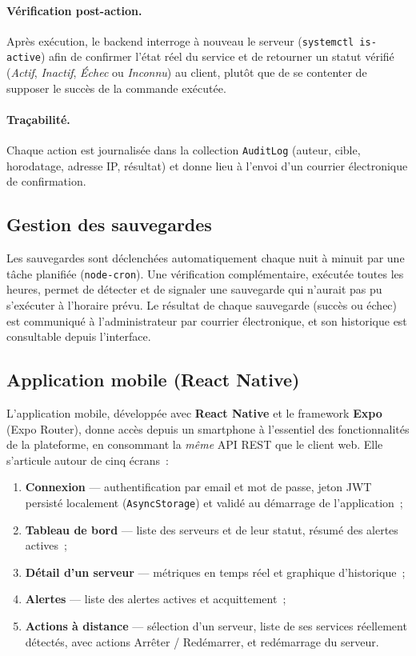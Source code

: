 \paragraph{Vérification post-action.} Après exécution, le backend interroge à nouveau le serveur (\texttt{systemctl is-active}) afin de confirmer l'état réel du service et de retourner un statut vérifié (\emph{Actif}, \emph{Inactif}, \emph{Échec} ou \emph{Inconnu}) au client, plutôt que de se contenter de supposer le succès de la commande exécutée.

\paragraph{Traçabilité.} Chaque action est journalisée dans la collection \texttt{AuditLog} (auteur, cible, horodatage, adresse IP, résultat) et donne lieu à l'envoi d'un courrier électronique de confirmation.

\subsection{Gestion des sauvegardes}

Les sauvegardes sont déclenchées automatiquement chaque nuit à minuit par une tâche planifiée (\texttt{node-cron}). Une vérification complémentaire, exécutée toutes les heures, permet de détecter et de signaler une sauvegarde qui n'aurait pas pu s'exécuter à l'horaire prévu. Le résultat de chaque sauvegarde (succès ou échec) est communiqué à l'administrateur par courrier électronique, et son historique est consultable depuis l'interface.

\subsection{Application mobile (React Native)}

L'application mobile, développée avec \textbf{React Native} et le framework \textbf{Expo} (Expo Router), donne accès depuis un smartphone à l'essentiel des fonctionnalités de la plateforme, en consommant la \emph{même} API REST que le client web. Elle s'articule autour de cinq écrans~:

\begin{enumerate}
  \item \textbf{Connexion} — authentification par email et mot de passe, jeton JWT persisté localement (\texttt{AsyncStorage}) et validé au démarrage de l'application~;
  \item \textbf{Tableau de bord} — liste des serveurs et de leur statut, résumé des alertes actives~;
  \item \textbf{Détail d'un serveur} — métriques en temps réel et graphique d'historique~;
  \item \textbf{Alertes} — liste des alertes actives et acquittement~;
  \item \textbf{Actions à distance} — sélection d'un serveur, liste de ses services réellement détectés, avec actions Arrêter / Redémarrer, et redémarrage du serveur.
\end{enumerate}

